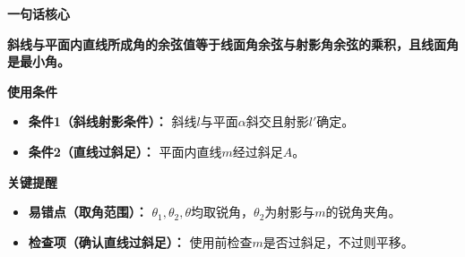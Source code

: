 \begin{summarybox}
	\textbf{\textcolor{CSummary}{一句话核心}}

	\textbf{斜线与平面内直线所成角的余弦值等于线面角余弦与射影角余弦的乘积，且线面角是最小角。}

	\medskip
	\textbf{\textcolor{CSummary}{使用条件}}
	\begin{itemize}[leftmargin=*, itemsep=0.5em, topsep=0.4em]
		\item \textbf{条件1（斜线射影条件）：} 斜线$l$与平面$\alpha$斜交且射影$l'$确定。
		\item \textbf{条件2（直线过斜足）：} 平面内直线$m$经过斜足$A$。
	\end{itemize}

	\medskip
	\textbf{\textcolor{CSummary}{关键提醒}}
	\begin{itemize}[leftmargin=*, itemsep=0.5em, topsep=0.4em]
		\item \textbf{易错点（取角范围）：} $\theta_1,\theta_2,\theta$均取锐角，$\theta_2$为射影与$m$的锐角夹角。
		\item \textbf{检查项（确认直线过斜足）：} 使用前检查$m$是否过斜足，不过则平移。
	\end{itemize}
\end{summarybox}
